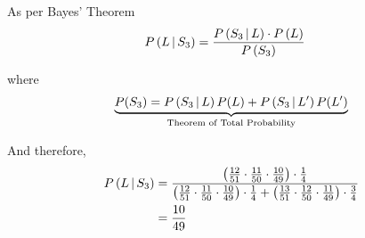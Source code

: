 \documentclass[14pt,fleqn]{extarticle}
\begin{document}
\newcard 

As per Bayes' Theorem 
\begin{align}
	P\left(L\,\vert\,S_3\right) &= \frac{P\left(S_3\,\vert\,L\right)\cdot P\left(L\right)}{P\left(S_3\right)}
\end{align} 

where 
\[\underbrace{P(S_3) = P\left(S_3\,\vert\,L\right)P(L)+ P\left(S_3\,\vert\,L'\right)P(L')}_{\text{Theorem of Total Probability}} \]

And therefore, 
\begin{align}
	P\left(L\,\vert\,S_3\right) &= \dfrac{\left(\frac{12}{51}\cdot\frac{11}{50}\cdot\frac{10}{49}\right)\cdot\frac{1}{4}}
            {\left(\frac{12}{51}\cdot\frac{11}{50}\cdot\frac{10}{49}\right)\cdot\frac{1}{4} + 
            \left(\frac{13}{51}\cdot\frac{12}{50}\cdot\frac{11}{49}\right)\cdot\frac{3}{4}} \\
            &= \dfrac{10}{49}
\end{align}
	
\end{document}
